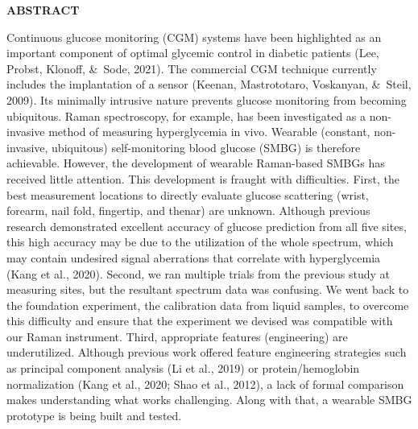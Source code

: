 {}

\begin{center}
    \large{\bf ABSTRACT}
\end{center}

Continuous glucose monitoring (CGM) systems have been highlighted as an important component of optimal glycemic control in diabetic patients (Lee, Probst, Klonoff, \&\ Sode, 2021). The commercial CGM technique currently includes the implantation of a sensor (Keenan, Mastrototaro, Voskanyan, \&\ Steil, 2009). Its minimally intrusive nature prevents glucose monitoring from becoming ubiquitous. Raman spectroscopy, for example, has been investigated as a non-invasive method of measuring hyperglycemia in vivo. Wearable (constant, non-invasive, ubiquitous) self-monitoring blood glucose (SMBG) is therefore achievable. However, the development of wearable Raman-based SMBGs has received little attention. This development is fraught with difficulties. First, the best measurement locations to directly evaluate glucose scattering (wrist, forearm, nail fold, fingertip, and thenar) are unknown. Although previous research demonstrated excellent accuracy of glucose prediction from all five sites, this high accuracy may be due to the utilization of the whole spectrum, which may contain undesired signal aberrations that correlate with hyperglycemia (Kang et al., 2020).
Second, we ran multiple trials from the previous study at measuring sites, but the resultant spectrum data was confusing. We went back to the foundation experiment, the calibration data from liquid samples, to overcome this difficulty and ensure that the experiment we devised was compatible with our Raman instrument. 
Third, appropriate features (engineering) are underutilized. Although previous work offered feature engineering strategies such as principal component analysis (Li et al., 2019) or protein/hemoglobin normalization (Kang et al., 2020; Shao et al., 2012), a lack of formal comparison makes understanding what works challenging. Along with that, a wearable SMBG prototype is being built and tested.
